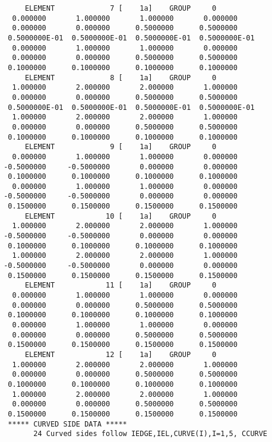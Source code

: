 \begin{verbatim}
      ELEMENT             7 [    1a]    GROUP     0
   0.000000       1.000000       1.000000       0.000000    
   0.000000       0.000000      0.5000000      0.5000000    
  0.5000000E-01  0.5000000E-01  0.5000000E-01  0.5000000E-01
   0.000000       1.000000       1.000000       0.000000    
   0.000000       0.000000      0.5000000      0.5000000    
  0.1000000      0.1000000      0.1000000      0.1000000    
      ELEMENT             8 [    1a]    GROUP     0
   1.000000       2.000000       2.000000       1.000000    
   0.000000       0.000000      0.5000000      0.5000000    
  0.5000000E-01  0.5000000E-01  0.5000000E-01  0.5000000E-01
   1.000000       2.000000       2.000000       1.000000    
   0.000000       0.000000      0.5000000      0.5000000    
  0.1000000      0.1000000      0.1000000      0.1000000    
      ELEMENT             9 [    1a]    GROUP     0
   0.000000       1.000000       1.000000       0.000000    
 -0.5000000     -0.5000000       0.000000       0.000000    
  0.1000000      0.1000000      0.1000000      0.1000000    
   0.000000       1.000000       1.000000       0.000000    
 -0.5000000     -0.5000000       0.000000       0.000000    
  0.1500000      0.1500000      0.1500000      0.1500000    
      ELEMENT            10 [    1a]    GROUP     0
   1.000000       2.000000       2.000000       1.000000    
 -0.5000000     -0.5000000       0.000000       0.000000    
  0.1000000      0.1000000      0.1000000      0.1000000    
   1.000000       2.000000       2.000000       1.000000    
 -0.5000000     -0.5000000       0.000000       0.000000    
  0.1500000      0.1500000      0.1500000      0.1500000    
      ELEMENT            11 [    1a]    GROUP     0
   0.000000       1.000000       1.000000       0.000000    
   0.000000       0.000000      0.5000000      0.5000000    
  0.1000000      0.1000000      0.1000000      0.1000000    
   0.000000       1.000000       1.000000       0.000000    
   0.000000       0.000000      0.5000000      0.5000000    
  0.1500000      0.1500000      0.1500000      0.1500000    
      ELEMENT            12 [    1a]    GROUP     0
   1.000000       2.000000       2.000000       1.000000    
   0.000000       0.000000      0.5000000      0.5000000    
  0.1000000      0.1000000      0.1000000      0.1000000    
   1.000000       2.000000       2.000000       1.000000    
   0.000000       0.000000      0.5000000      0.5000000    
  0.1500000      0.1500000      0.1500000      0.1500000    
  ***** CURVED SIDE DATA *****
        24 Curved sides follow IEDGE,IEL,CURVE(I),I=1,5, CCURVE

\end{verbatim}
